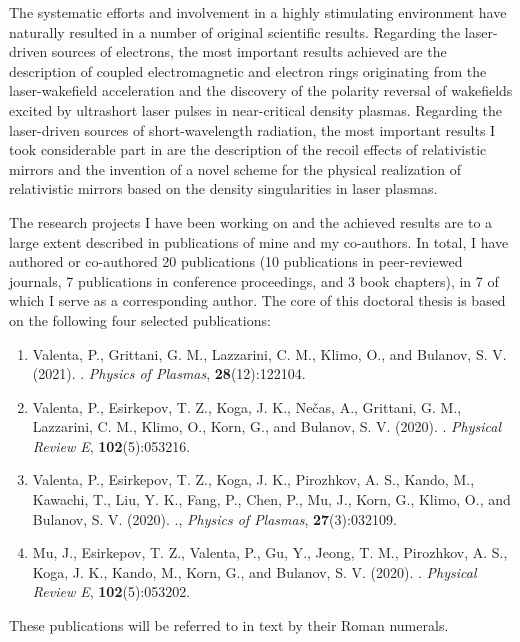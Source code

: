 \documentclass[10pt, a4paper, twoside, openright]{report}
\newcommand{\link}[3][blue]{\href{#2}{\color{#1}{#3}}}%
\begin{document}
The systematic efforts and involvement in a highly stimulating environment have naturally resulted in a number of original scientific results. Regarding the laser-driven sources of electrons, the most important results achieved are the description of coupled electromagnetic and electron rings originating from the laser-wakefield acceleration and the discovery of the polarity reversal of wakefields excited by ultrashort laser pulses in near-critical density plasmas. Regarding the laser-driven sources of short-wavelength radiation, the most important results I took considerable part in are the description of the recoil effects of relativistic mirrors and the invention of a novel scheme for the physical realization of relativistic mirrors based on the density singularities in laser plasmas. 

The research projects I have been working on and the achieved results are to a large extent described in publications of mine and my co-authors. In total, I have authored or co-authored 20 publications (10 publications in peer-reviewed journals, 7 publications in conference proceedings, and 3 book chapters), in 7 of which I serve as a corresponding author. The core of this doctoral thesis is based on the following four selected publications:
\begin{enumerate}[label=\Roman*.]
	\item \label{paper_1} Valenta, P., Grittani, G. M., Lazzarini, C. M., Klimo, O., and Bulanov, S. V. (2021). \link{https://doi.org/10.1063/5.0065167}{On the electromagnetic-electron rings originating from the interaction of high-power short-pulse laser and underdense plasma}. \textit{Physics of Plasmas}, \textbf{28}(12):122104.
	
	\item \label{paper_2} Valenta, P., Esirkepov, T. Z., Koga, J. K., Nečas, A., Grittani, G. M., Lazzarini, C. M., Klimo, O., Korn, G., and Bulanov, S. V. (2020). \link{https://doi.org/10.1103/PhysRevE.102.053216}{Polarity reversal of wakefields driven by ultrashort pulse laser}. \textit{Physical Review E}, \textbf{102}(5):053216.
	
	\item \label{paper_3} Valenta, P., Esirkepov, T. Z., Koga, J. K., Pirozhkov, A. S., Kando, M., Kawachi, T., Liu, Y. K., Fang, P., Chen, P., Mu, J., Korn, G., Klimo, O., and Bulanov, S. V. (2020). \link{https://doi.org/10.1063/1.5142084}{Recoil effects on reflection from relativistic mirrors in laser plasmas}., \textit{Physics of Plasmas}, \textbf{27}(3):032109.
	
	\item \label{paper_4} Mu, J., Esirkepov, T. Z., Valenta, P., Gu, Y., Jeong, T. M., Pirozhkov, A. S., Koga, J. K., Kando, M., Korn, G., and Bulanov, S. V. (2020). \link{https://doi.org/10.1103/PhysRevE.102.053202}{Relativistic flying forcibly oscillating reflective diffraction grating}. \textit{Physical Review E}, \textbf{102}(5):053202.
	
\end{enumerate}
These publications will be referred to in text by their Roman numerals.
\end{document}
